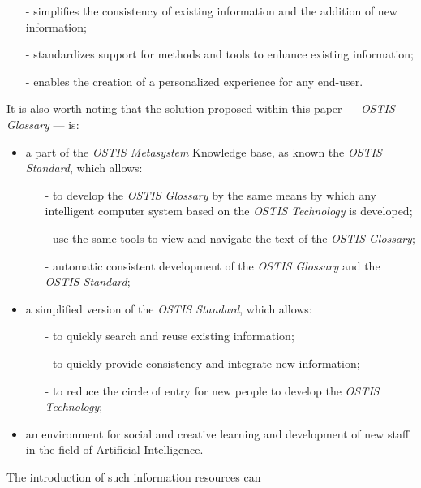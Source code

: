 \documentclass[a4paper]{article}
\begin{document}
\begin{multicols}{2}
\fontsize{10}{13}\selectfont
\begin{itemize}
    \item[-]simplifies the consistency of existing information
and the addition of new information;
    \item[-]standardizes support for methods and tools to
 enhance existing information;
    \item[-] enables the creation of a personalized experience
for any end-user.
\end{itemize}



\par It is also worth noting that the solution proposed
within this paper — \textit{OSTIS Glossary} — is:
\begin{itemize}
    \item a part of the \textit{OSTIS Metasystem} Knowledge base, as
    known the \textit{OSTIS Standard}, which allows:
        \begin{itemize}[leftmargin=3.5mm]
            \item [-]to develop the \textit{OSTIS Glossary} by the same means
by which any intelligent computer system based
on the \textit{OSTIS Technology} is developed;
            \item [-]use the same tools to view and navigate the text
of the \textit{OSTIS Glossary};
            \item [-]automatic consistent development of the \textit{OSTIS
Glossary} and the \textit{OSTIS Standard};
        \end{itemize}
    \item a simplified version of the \textit{OSTIS Standard}, which
allows:
        \begin{itemize}[leftmargin=3.5mm]
            \item[-]to quickly search and reuse existing information;
            \item[-]to quickly provide consistency and integrate new
information;
            \item[-]to reduce the circle of entry for new people to
develop the \textit{OSTIS Technology};
        \end{itemize}
    \item an environment for social and creative learning and
development of new staff in the field of Artificial
Intelligence.\
\end{itemize}
\par The introduction of such information resources can

\end{multicols}
\end{document}

